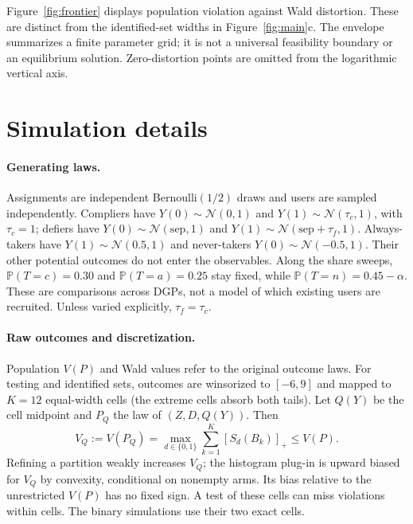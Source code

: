 \documentclass{article}
\theoremstyle{remark}
\newcommand{\Prob}{\mathbb{P}}
\begin{document}
Figure~\ref{fig:frontier} displays population violation against Wald distortion. These are distinct from the identified-set widths in Figure~\ref{fig:main}c. The envelope summarizes a finite parameter grid; it is not a universal feasibility boundary or an equilibrium solution. Zero-distortion points are omitted from the logarithmic vertical axis.

\section{Simulation details}\label{app:sim}

\paragraph{Generating laws.}
Assignments are independent Bernoulli$(1/2)$ draws and users are sampled
independently. Compliers have $Y(0)\sim\mathcal N(0,1)$ and
$Y(1)\sim\mathcal N(\tau_c,1)$, with $\tau_c=1$; defiers have
$Y(0)\sim\mathcal N(\mathrm{sep},1)$ and
$Y(1)\sim\mathcal N(\mathrm{sep}+\tau_f,1)$. Always-takers have
$Y(1)\sim\mathcal N(0.5,1)$ and never-takers $Y(0)\sim\mathcal N(-0.5,1)$.
Their other potential outcomes do not enter the observables. Along the share
sweeps, $\Prob(T=c)=0.30$ and $\Prob(T=a)=0.25$ stay fixed, while
$\Prob(T=n)=0.45-\alpha$. These are comparisons across DGPs, not a model of
which existing users are recruited. Unless varied explicitly, $\tau_f=\tau_c$.

\paragraph{Raw outcomes and discretization.}
Population $V(P)$ and Wald values refer to the original outcome laws.
For testing and identified sets, outcomes are winsorized to $[-6,9]$ and
mapped to $K=12$ equal-width cells (the extreme cells absorb both tails).
Let $Q(Y)$ be the cell midpoint and $P_Q$ the law of $(Z,D,Q(Y))$. Then
\[
V_Q:=V(P_Q)=\max_{d\in\{0,1\}}\sum_{k=1}^K[S_d(B_k)]_+\le V(P).
\]
Refining a partition weakly increases $V_Q$; the histogram plug-in is upward
biased for $V_Q$ by convexity, conditional on nonempty arms. Its bias relative
to the unrestricted $V(P)$ has no fixed sign. A test of these cells can miss
violations within cells. The binary simulations use their two exact cells.
\end{document}
